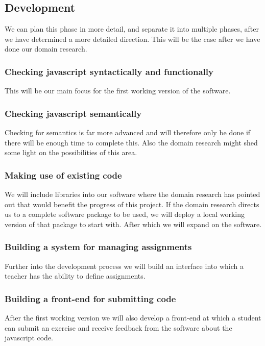 \documentclass{article}
\begin{document}
\subsection{Development}
We can plan this phase in more detail, and separate it into multiple phases, after we have determined a more detailed direction. This will be the case after we have done our domain research.

\subsubsection{Checking javascript syntactically and functionally}
This will be our main focus for the first working version of the software.
\subsubsection{Checking javascript semantically}
Checking for semantics is far more advanced and will therefore only be done if there will be enough time to complete this. Also the domain research might shed some light on the possibilities of this area.
\subsubsection{Making use of existing code}
We will include libraries into our software where the domain research has pointed out that would benefit the progress of this project. If the domain research directs us to a complete software package to be used, we will deploy a local working version of that package to start with. After which we will expand on the software.
\subsubsection{Building a system for managing assignments}
Further into the development process we will build an interface into which a teacher has the ability to define assignments.
\subsubsection{Building a front-end for submitting code}
After the first working version we will also develop a front-end at which a student can submit an exercise and receive feedback from the software about the javascript code.
\end{document}
